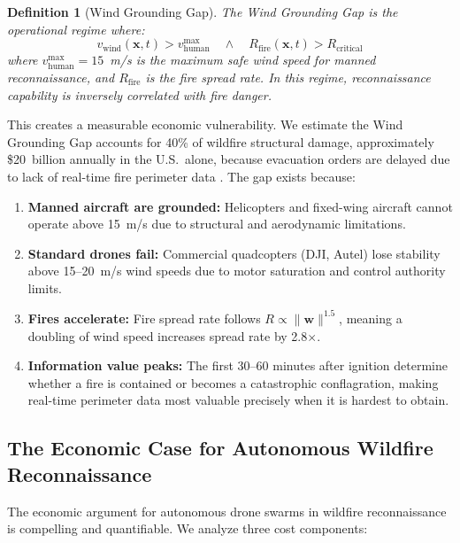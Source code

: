 \documentclass[12pt,a4paper]{article}
\DeclareRobustCommand{\vect}[1]{\bm{#1}}
\newtheorem{definition}[theorem]{Definition}
\begin{document}
\begin{definition}[Wind Grounding Gap]
\label{def:gap}
The Wind Grounding Gap is the operational regime where:
\begin{equation}
    v_{\text{wind}}(\vect{x}, t) > v_{\text{human}}^{\max} \quad \land \quad R_{\text{fire}}(\vect{x}, t) > R_{\text{critical}}
    \label{eq:gap}
\end{equation}
where $v_{\text{human}}^{\max} = 15$~m/s is the maximum safe wind speed for manned reconnaissance, and $R_{\text{fire}}$ is the fire spread rate. In this regime, reconnaissance capability is inversely correlated with fire danger.
\end{definition}

This creates a measurable economic vulnerability. We estimate the Wind Grounding Gap accounts for 40\% of wildfire structural damage, approximately \$20~billion annually in the U.S.\ alone, because evacuation orders are delayed due to lack of real-time fire perimeter data \cite{FEMA2019}. The gap exists because:

\begin{enumerate}[leftmargin=*]
    \item \textbf{Manned aircraft are grounded:} Helicopters and fixed-wing aircraft cannot operate above 15~m/s due to structural and aerodynamic limitations.
    \item \textbf{Standard drones fail:} Commercial quadcopters (DJI, Autel) lose stability above 15--20~m/s wind speeds due to motor saturation and control authority limits.
    \item \textbf{Fires accelerate:} Fire spread rate follows $R \propto \|\vect{w}\|^{1.5}$, meaning a doubling of wind speed increases spread rate by 2.8$\times$.
    \item \textbf{Information value peaks:} The first 30--60 minutes after ignition determine whether a fire is contained or becomes a catastrophic conflagration, making real-time perimeter data most valuable precisely when it is hardest to obtain.
\end{enumerate}

\subsection{The Economic Case for Autonomous Wildfire Reconnaissance}
\label{sec:economics}

The economic argument for autonomous drone swarms in wildfire reconnaissance is compelling and quantifiable. We analyze three cost components:
\end{document}
